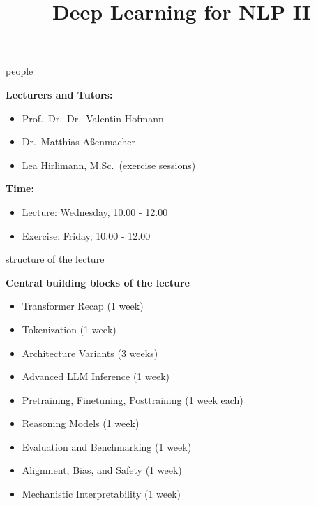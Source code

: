 \documentclass[11pt,compress,t,notes=noshow, xcolor=table]{beamer}
\title{Deep Learning for NLP II}
\begin{document}


\begin{frame}{people}

\vfill

\textbf{Lecturers and Tutors:}

	\begin{itemize}
		\item Prof.\ Dr.\ Dr.\ Valentin Hofmann
		\item Dr.\ Matthias Aßenmacher
		\item Lea Hirlimann, M.Sc.\ (exercise sessions)
	\end{itemize}

\textbf{Time:}

	\begin{itemize}
		\item Lecture: Wednesday, 10.00 - 12.00
		\item Exercise: Friday, 10.00 - 12.00
	\end{itemize}

\vfill

\end{frame}



\begin{frame}{structure of the lecture}

\vfill

\textbf{Central building blocks of the lecture}

	\begin{itemize}
		\item Transformer Recap (1 week)
		\item Tokenization (1 week)
		\item Architecture Variants (3 weeks)
		\item Advanced LLM Inference (1 week)
		\item Pretraining, Finetuning, Posttraining (1 week each)
		\item Reasoning Models (1 week)
		\item Evaluation and Benchmarking (1 week)
		\item Alignment, Bias, and Safety (1 week)
		\item Mechanistic Interpretability (1 week)
	\end{itemize}

\vfill

\end{frame}
\end{document}
